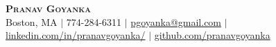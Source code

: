 
\begin{center}
  \textbf{\Huge \scshape Pranav Goyanka} \\ \vspace{1pt}
  \small Boston, MA $|$
  \small 774-284-6311 $|$ \href{mailto:pgoyanka@gmail.com}{pgoyanka@gmail.com} $|$ 
  \href{https://www.linkedin.com/in/pranavgoyanka/}{linkedin.com/in/pranavgoyanka/} $|$
  \href{https://github.com/pranavgoyanka/}{github.com/pranavgoyanka}
\end{center}